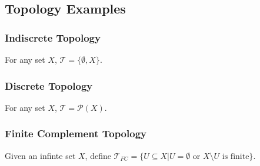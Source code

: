 \subsection{Topology Examples}\label{exampletopologies}

\subsubsection{Indiscrete Topology}\label{indiscretetopology}

For any set $X$, $\mathcal{T} = \{\emptyset, X\}$.

\subsubsection{Discrete Topology}\label{discretetopology}

For any set $X$, $\mathcal{T} = \mathcal{P}(X)$.

\subsubsection{Finite Complement Topology}\label{finitecomplementtopology}

Given an infinte set $X$, define $\mathcal{T}_{FC} = \{U \subseteq X | U = \emptyset \textrm{ or } X \setminus U \textrm{ is finite}\}$.
